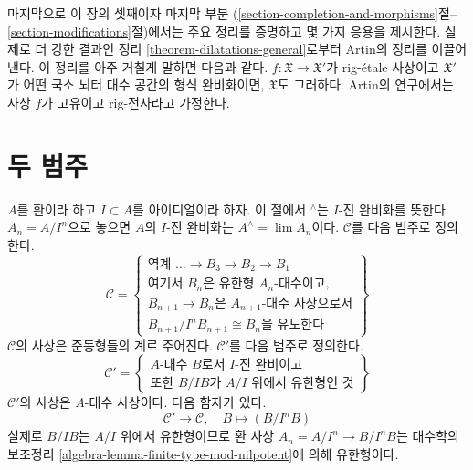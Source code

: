 \medskip\noindent
마지막으로 이 장의 셋째이자 마지막 부분
(\ref{section-completion-and-morphisms}절--\ref{section-modifications}절)에서는
주요 정리를 증명하고 몇 가지 응용을 제시한다. 실제로 더 강한 결과인 정리
\ref{theorem-dilatations-general}로부터 Artin의 정리를 이끌어 낸다. 이 정리를
아주 거칠게 말하면 다음과 같다. $f : \mathfrak X \to \mathfrak X'$가
rig-\'etale 사상이고 $\mathfrak X'$가 어떤 국소 뇌터 대수 공간의 형식 완비화이면,
$\mathfrak X$도 그러하다. Artin의 연구에서는 사상 $f$가 고유이고 rig-전사라고
가정한다.


\section{두 범주}
\label{section-two-categories}

\noindent
$A$를 환이라 하고 $I \subset A$를 아이디얼이라 하자.
이 절에서 ${}^\wedge$는 $I$-진 완비화를 뜻한다.
$A_n = A/I^n$으로 놓으면 $A$의 $I$-진 완비화는
$A^\wedge = \lim A_n$이다. $\mathcal{C}$를 다음 범주로 정의한다.
\begin{equation}
\label{equation-C}
\mathcal{C} =
\left\{
\begin{matrix}
\text{역계 }\ldots \to B_3 \to B_2 \to B_1 \\
\text{여기서 }B_n\text{은 유한형 }A_n\text{-대수이고,}\\
B_{n + 1} \to B_n\text{은 }A_{n + 1}\text{-대수 사상으로서}\\
B_{n + 1}/I^nB_{n + 1} \cong B_n\text{을 유도한다}
\end{matrix}
\right\}
\end{equation}
$\mathcal{C}$의 사상은 준동형들의 계로 주어진다.
$\mathcal{C}'$를 다음 범주로 정의한다.
\begin{equation}
\label{equation-C-prime}
\mathcal{C}' =
\left\{
\begin{matrix}
A\text{-대수 }B\text{로서 }I\text{-진 완비이고}\\
\text{또한 }B/IB\text{가 }A/I\text{ 위에서 유한형인 것}
\end{matrix}
\right\}
\end{equation}
$\mathcal{C}'$의 사상은 $A$-대수 사상이다. 다음 함자가 있다.
\begin{equation}
\label{equation-from-complete-to-systems}
\mathcal{C}' \longrightarrow \mathcal{C},\quad
B \longmapsto (B/I^nB)
\end{equation}
실제로 $B/IB$는 $A/I$ 위에서 유한형이므로 환 사상
$A_n = A/I^n \to B/I^nB$는 대수학의 보조정리
\ref{algebra-lemma-finite-type-mod-nilpotent}에 의해 유한형이다.

